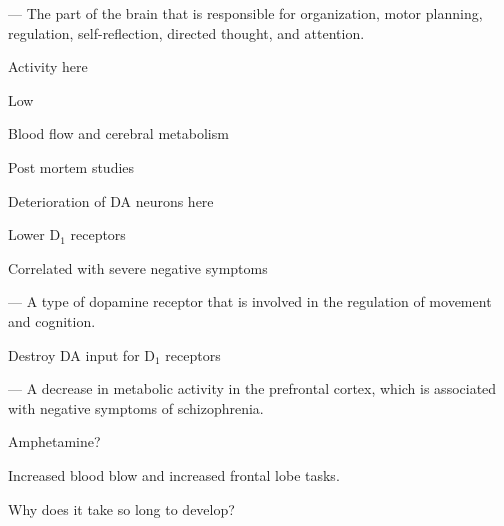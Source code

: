 \begin{coloredlist}
    \item {} — The part of the brain that is responsible for organization, motor planning, regulation, self-reflection, directed thought, and attention.
    \begin{coloredlist}
        \item Activity here
        \begin{coloredlist}
            \item Low
            \begin{coloredlist}
                \item Blood flow and cerebral metabolism
            \end{coloredlist}
        \end{coloredlist}
        \item Post mortem studies
        \begin{coloredlist}
            \item Deterioration of DA neurons here
            \item Lower \(\text{D}_{1}\) receptors
            \begin{coloredlist}
                \item Correlated with severe negative symptoms
                \item {} — A type of dopamine receptor that is involved in the regulation of movement and cognition.
            \end{coloredlist}
        \end{coloredlist}
        \item Destroy DA input for \(\text{D}_{1}\) receptors
        \begin{coloredlist}
            \item {} — A decrease in metabolic activity in the prefrontal cortex, which is associated with negative symptoms of schizophrenia.
            \item Amphetamine?
            \begin{coloredlist}
                \item Increased blood blow and increased frontal lobe tasks.
            \end{coloredlist}
        \end{coloredlist}
        \item Why does it take so long to develop?
        \begin{coloredlist}

\end{coloredlist}
\end{coloredlist}
\end{coloredlist}
